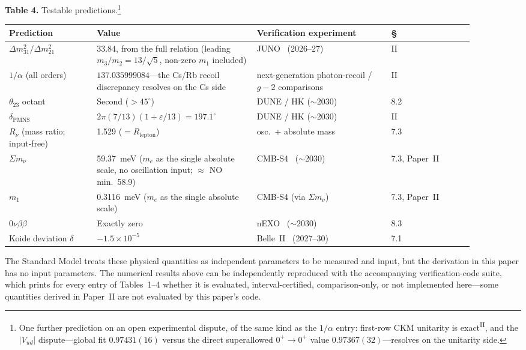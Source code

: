 \documentclass[12pt,a4paper]{article}
\newcommand{\PII}{\textsuperscript{\textup{II}}}
\begin{document}
\medskip
{}
\bigskip\noindent\textbf{Table 4.} Testable predictions.\footnote{One further prediction on an open experimental dispute, of the same kind as the $1/\alpha$ entry: first-row CKM unitarity is exact\PII{}, and the $|V_{ud}|$ dispute---global fit $0.97431(16)$ versus the direct superallowed $0^+\to0^+$ value $0.97367(32)$---resolves on the unitarity side.}
\nopagebreak[4]
\begin{center}\footnotesize
\begin{tabular}{@{}p{0.17\linewidth}p{0.31\linewidth}p{0.26\linewidth}p{0.16\linewidth}@{}}
\toprule
Prediction & Value & Verification experiment & \S \\
\midrule
$\Delta m^2_{31}/\Delta m^2_{21}$ & $33.84$, from the full relation (leading $m_3/m_2 = 13/\sqrt{5}$, non-zero $m_1$ included) & JUNO~\cite{juno} (2026--27) & II \\
$1/\alpha$ (all orders) & $137.035999084$---the Cs/Rb recoil discrepancy resolves on the Cs side & next-generation photon-recoil / $g{-}2$ comparisons & II \\
$\theta_{23}$ octant & Second ($>45^\circ$) & DUNE / HK ($\sim$2030) & 8.2 \\
$\delta_\mathrm{PMNS}$ & $2\pi(7/13)(1+\varepsilon/13) = 197.1^\circ$ & DUNE / HK ($\sim$2030) & II \\
$R_\nu$ (mass ratio; input-free) & 1.529 ($= R_\mathrm{lepton}$) & osc.\ + absolute mass & 7.3 \\
$\Sigma m_\nu$ & 59.37~meV ($m_e$ as the single absolute scale, no oscillation input; $\approx$ NO min.\ 58.9) & CMB-S4~\cite{cmbs4} ($\sim$2030) & 7.3, Paper~II \\
$m_1$ & 0.3116~meV ($m_e$ as the single absolute scale) & CMB-S4 (via $\Sigma m_\nu$) & 7.3, Paper~II \\
$0\nu\beta\beta$ & Exactly zero & nEXO~\cite{nexo} ($\sim$2030) & 8.3 \\
Koide deviation $\delta$ & $-1.5 \times 10^{-5}$ & Belle~II~\cite{belleii} (2027--30) & 7.1 \\
\bottomrule
\end{tabular}
\end{center}

\medskip
The Standard Model treats these physical quantities as independent
parameters to be measured and input, but the derivation in this
paper has no input parameters. The numerical results above
can be independently reproduced with the accompanying
verification-code suite, which prints for every entry of
Tables~1--4 whether it is evaluated, interval-certified,
comparison-only, or not implemented here---some quantities derived
in Paper~II are not evaluated by this paper's code.
\end{document}
